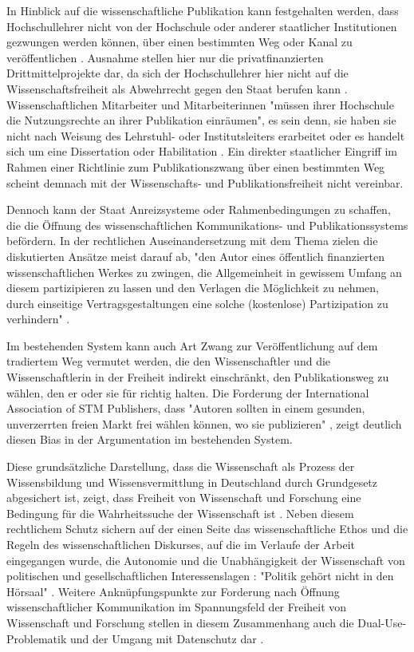 In Hinblick auf die wissenschaftliche Publikation kann festgehalten werden, dass Hochschullehrer nicht von der Hochschule oder anderer staatlicher Institutionen gezwungen werden können, über einen bestimmten Weg oder Kanal zu veröffentlichen \cite{spindler_2006_rechtloa} \cite{dorschel_2006_open}. Ausnahme stellen hier nur die privatfinanzierten Drittmittelprojekte dar, da sich der Hochschullehrer hier nicht auf die Wissenschaftsfreiheit als Abwehrrecht gegen den Staat berufen kann \cite{spindler_2006_rechtloa}. Wissenschaftlichen Mitarbeiter und Mitarbeiterinnen "müssen ihrer Hochschule die Nutzungsrechte an ihrer Publikation einräumen", es sein denn, sie haben sie nicht nach Weisung des Lehrstuhl- oder Institutsleiters erarbeitet oder es handelt sich um eine Dissertation oder Habilitation \cite{spindler_2006_rechtloa}. Ein direkter staatlicher Eingriff im Rahmen einer Richtlinie zum Publikationszwang über einen bestimmten Weg scheint demnach mit der Wissenschafts- und Publikationsfreiheit nicht vereinbar.

Dennoch kann der Staat Anreizsysteme oder Rahmenbedingungen zu schaffen, die die Öffnung des wissenschaftlichen Kommunikations- und Publikationssystems befördern. In der rechtlichen Auseinandersetzung mit dem Thema zielen die diskutierten Ansätze meist darauf ab, "den Autor eines öffentlich finanzierten wissenschaftlichen Werkes zu zwingen, die Allgemeinheit in gewissem Umfang an diesem partizipieren zu lassen und den Verlagen die Möglichkeit zu nehmen, durch einseitige Vertragsgestaltungen eine solche (kostenlose) Partizipation zu verhindern" \cite{dorschel_2006_open}.

Im bestehenden System kann auch Art Zwang zur Veröffentlichung auf dem tradiertem Weg vermutet werden, die den Wissenschaftler und die Wissenschaftlerin in der Freiheit indirekt einschränkt, den Publikationsweg zu wählen, den er oder sie für richtig halten. Die Forderung der International Association of STM Publishers, dass "Autoren sollten in einem gesunden, unverzerrten freien Markt frei wählen können, wo sie publizieren" \cite{Brussels_Declaration_2007}, zeigt deutlich diesen Bias in der Argumentation im bestehenden System.

Diese grundsätzliche Darstellung, dass die Wissenschaft als Prozess der Wissensbildung und Wissensvermittlung in Deutschland durch Grundgesetz abgesichert ist, zeigt, dass Freiheit von Wissenschaft und Forschung eine Bedingung für die Wahrheitssuche der Wissenschaft ist \cite{Oezmen_2015}. Neben diesem rechtlichem Schutz sichern auf der einen Seite das wissenschaftliche Ethos und die Regeln des wissenschaftlichen Diskurses, auf die im Verlaufe der Arbeit eingegangen wurde, die Autonomie und die Unabhängigkeit der Wissenschaft von politischen und gesellschaftlichen Interessenslagen \cite{Oezmen_2015}: "Politik gehört nicht in den Hörsaal" \cite[:494]{Weber_1992}. Weitere Anknüpfungspunkte zur Forderung nach Öffnung wissenschaftlicher Kommunikation im Spannungsfeld der Freiheit von Wissenschaft und Forschung stellen in diesem Zusammenhang auch die Dual-Use-Problematik und der Umgang mit Datenschutz dar \cite{Fritsch_2015}.

